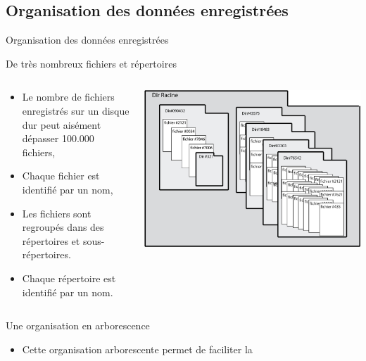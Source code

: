 \subsection{Organisation des données enregistrées}
\begin{frame}{Organisation des données enregistrées}
  \begin{block}{De très nombreux fichiers et répertoires}
    \begin{columns}
      \begin{column}{.7\linewidth}
        \begin{itemize}
        \item Le nombre de fichiers enregistrés sur un disque dur peut
          aisément dépasser 100.000 fichiers,
        \item Chaque fichier est identifié par un nom,
        \item Les fichiers sont regroupés dans des répertoires et
          sous-répertoires.
        \item Chaque répertoire est identifié par un nom.
        \end{itemize}
      \end{column}%
      \begin{column}{.25\linewidth}
        \includegraphics[width=\linewidth]{img/s02/file_system}
      \end{column}
    \end{columns}
  \end{block}
  \begin{block}{Une organisation en arborescence}
    \begin{itemize}
    \item Cette organisation arborescente permet de faciliter la

\end{itemize}
\end{block}
\end{frame}
